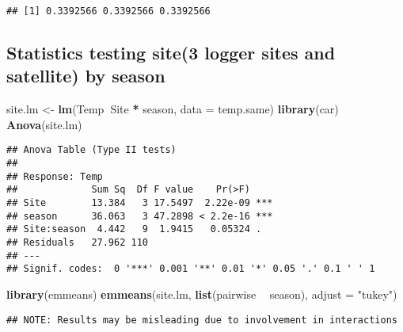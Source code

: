 \documentclass[
]{article}
\newenvironment{Shaded}{\begin{snugshade}}{\end{snugshade}}
\newcommand{\DataTypeTok}[1]{\textcolor[rgb]{0.13,0.29,0.53}{#1}}
\newcommand{\KeywordTok}[1]{\textcolor[rgb]{0.13,0.29,0.53}{\textbf{#1}}}
\newcommand{\NormalTok}[1]{#1}
\newcommand{\OperatorTok}[1]{\textcolor[rgb]{0.81,0.36,0.00}{\textbf{#1}}}
\newcommand{\StringTok}[1]{\textcolor[rgb]{0.31,0.60,0.02}{#1}}
\begin{document}
\begin{verbatim}
## [1] 0.3392566 0.3392566 0.3392566
\end{verbatim}

\hypertarget{statistics-testing-site3-logger-sites-and-satellite-by-season}{%
\subsection{Statistics testing site(3 logger sites and satellite) by
season}\label{statistics-testing-site3-logger-sites-and-satellite-by-season}}

\begin{Shaded}
\begin{Highlighting}[]
\NormalTok{site.lm <-}\StringTok{ }\KeywordTok{lm}\NormalTok{(Temp}\OperatorTok{~}\NormalTok{Site }\OperatorTok{*}\StringTok{ }\NormalTok{season, }\DataTypeTok{data =}\NormalTok{ temp.same)}
\KeywordTok{library}\NormalTok{(car)}
\KeywordTok{Anova}\NormalTok{(site.lm)}
\end{Highlighting}
\end{Shaded}

\begin{verbatim}
## Anova Table (Type II tests)
## 
## Response: Temp
##             Sum Sq  Df F value    Pr(>F)    
## Site        13.384   3 17.5497  2.22e-09 ***
## season      36.063   3 47.2898 < 2.2e-16 ***
## Site:season  4.442   9  1.9415   0.05324 .  
## Residuals   27.962 110                      
## ---
## Signif. codes:  0 '***' 0.001 '**' 0.01 '*' 0.05 '.' 0.1 ' ' 1
\end{verbatim}

\begin{Shaded}
\begin{Highlighting}[]
\KeywordTok{library}\NormalTok{(emmeans)}
\KeywordTok{emmeans}\NormalTok{(site.lm, }\KeywordTok{list}\NormalTok{(pairwise }\OperatorTok{~}\StringTok{ }\NormalTok{season), }\DataTypeTok{adjust =} \StringTok{"tukey"}\NormalTok{)}
\end{Highlighting}
\end{Shaded}

\begin{verbatim}
## NOTE: Results may be misleading due to involvement in interactions
\end{verbatim}
\end{document}
